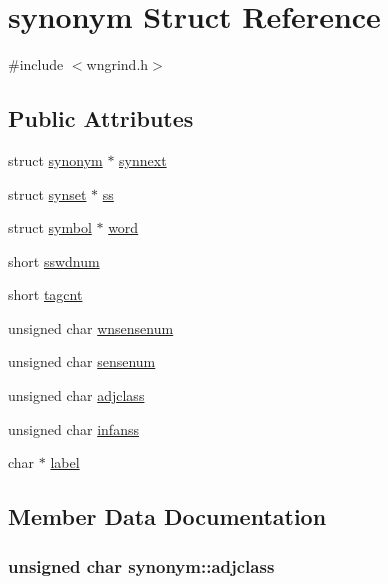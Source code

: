 \hypertarget{structsynonym}{}\section{synonym Struct Reference}
\label{structsynonym}


{\ttfamily \#include $<$wngrind.\+h$>$}

\subsection*{Public Attributes}
\begin{DoxyCompactItemize}
\item 
struct \hyperlink{structsynonym}{synonym} $\ast$ \hyperlink{structsynonym_aa52cb3012712a599111a9306c6c7821f}{synnext}
\item 
struct \hyperlink{structsynset}{synset} $\ast$ \hyperlink{structsynonym_afb6e3d7b4af47cbd982c32381054bf6d}{ss}
\item 
struct \hyperlink{structsymbol}{symbol} $\ast$ \hyperlink{structsynonym_a76fb3a2c037b88010fd0f402ca48f1e2}{word}
\item 
short \hyperlink{structsynonym_a2ae26eef29c66c22ce2b6d3c4cb00884}{sswdnum}
\item 
short \hyperlink{structsynonym_aa8d3b5cfe5c1655dd17dbeb33c5a32ee}{tagcnt}
\item 
unsigned char \hyperlink{structsynonym_a5c9bd36f2044cf3efe20bdc80047fa87}{wnsensenum}
\item 
unsigned char \hyperlink{structsynonym_af4c83833e99b2c620defd3be9346f47c}{sensenum}
\item 
unsigned char \hyperlink{structsynonym_a4950ed90421213474467e7e809c7b1cf}{adjclass}
\item 
unsigned char \hyperlink{structsynonym_a8d20f5c5cfb4f4bcb1f638e21ebdcbc6}{infanss}
\item 
char $\ast$ \hyperlink{structsynonym_ad03a38ac09acf1a4aeaf8c1793e354aa}{label}
\end{DoxyCompactItemize}


\subsection{Member Data Documentation}
\subsubsection[{\texorpdfstring{adjclass}{adjclass}}]{\setlength{\rightskip}{0pt plus 5cm}unsigned char synonym\+::adjclass}\hypertarget{structsynonym_a4950ed90421213474467e7e809c7b1cf}{}\label{structsynonym_a4950ed90421213474467e7e809c7b1cf}
